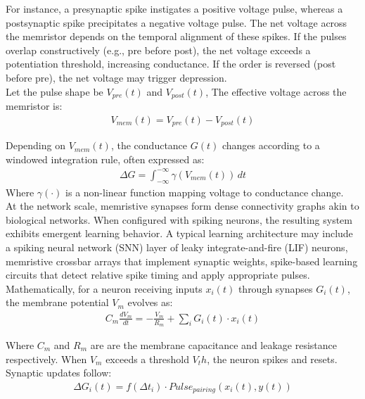 \noindent For instance, a presynaptic spike instigates a positive voltage pulse, whereas a postsynaptic spike precipitates a negative voltage pulse. The net voltage across the memristor depends on the temporal alignment of these spikes. If the pulses overlap constructively (e.g., pre before post), the net voltage exceeds a potentiation threshold, increasing conductance. If the order is reversed (post before pre), the net voltage may trigger depression. \\

\noindent Let the pulse shape be $V_{pre}(t)$ and $V_{post}(t)$, The effective voltage across the memristor is:
\begin{align}
    V_{mem}(t) = V_{pre}(t) - V_{post}(t) \label{eq:1.34}
\end{align}

\noindent Depending on $ V_{mem}(t)$, the conductance $G(t)$ changes according to a windowed integration rule, often expressed as:
\begin{align}
    \Delta G = \int_{-\infty}^{-\infty} \gamma (V_{mem}(t)) \,dt \label{eq:1.35}
\end{align}
\noindent Where $\gamma(\cdot)$ is a non-linear function mapping voltage to conductance change. \\

\noindent At the network scale, memristive synapses form dense connectivity graphs akin to biological networks. When configured with spiking neurons, the resulting system exhibits emergent learning behavior. A typical learning architecture may include a spiking neural network (SNN) layer of leaky integrate-and-fire (LIF) neurons, memristive crossbar arrays that implement synaptic weights, spike-based learning circuits that detect relative spike timing and apply appropriate pulses.\\

\noindent Mathematically, for a neuron receiving inputs $x_i(t)$ through synapses $G_i(t)$, the membrane potential $V_m$ evolves as:
\begin{align}
    C_m \frac{dV_m}{dt} = -\frac{V_m}{R_m} + \sum_{i} G_i(t) \cdot x_i(t) \label{eq:1.36}
\end{align}

\noindent Where $C_m$ and $R_m$ are are the membrane capacitance and leakage resistance respectively. When $V_m$ exceeds a threshold $V_th$, the neuron spikes and resets. Synaptic updates follow:
\begin{align}
    \Delta G_i(t) = f(\Delta t_i) \cdot Pulse_{pairing}(x_i(t), y(t)) \label{eq:1.37}
\end{align}

